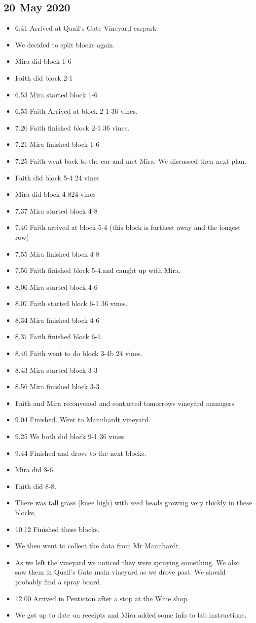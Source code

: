 \documentclass[11pt,letter]{article}
\newenvironment{smitemize}{
\begin{itemize}
  \setlength{\itemsep}{0pt}
  \setlength{\parskip}{0.8pt}
  \setlength{\parsep}{0pt}}
{\end{itemize}
}
\begin{document}
\subsection{20 May 2020}
\begin{smitemize}
\item 6.41 Arrived at Quail's Gate Vineyard carpark 
\item We decided to split blocks again. 
\item Mira did block 1-6
\item Faith did block 2-1
\item 6.53 Mira started block 1-6
\item 6.55 Faith Arrived at block 2-1 36 vines.
\item 7.20 Faith finished block 2-1 36 vines.
\item 7.21 Mira finished block 1-6
\item 7.25 Faith went back to the car and met Mira. We discussed then next plan. 
\item Faith did  block 5-4 24 vines
\item Mira did block 4-824 vines 
\item 7.37 Mira started block 4-8
\item 7.40 Faith arrived at block 5-4 (this block is furthest away and the longest row)
\item 7.55 Mira finished block 4-8
\item 7.56 Faith finished block 5-4.and caught up with Mira.
\item 8.06 Mira started block 4-6
\item 8.07 Faith started  block 6-1 36 vines.
\item 8.34 Mira finished block 4-6
\item 8.37 Faith finished block 6-1.
\item 8.40 Faith went to do block 3-4b 24 vines.
\item 8.43 Mira started block 3-3
\item 8.56 Mira finished block 3-3
\item Faith and Mira reconvened and contacted tomorrows vineyard managers
\item 9.04 Finished. Went to Mannhardt vineyard.
\item 9.25 We both did block 9-1 36 vines.
\item 9.44 Finished and drove to the next blocks.
\item Mira did 8-6.
\item Faith did 8-8.
\item There was tall grass (knee high) with seed heads growing very thickly in these blocks, 
\item 10.12 Finished these blocks.
\item We then went to collect the data from Mr Mannhardt. 
\item As we left the vineyard we noticed they were spraying something. We also saw them in Quail's Gate main vineyard as we drove past. We should probably find a spray board. 
\item 12.00 Arrived in Penticton after a stop at the Wine shop. 
\item We got up to date on receipts and Mira added some info to lab instructions.


\end{smitemize}
\end{document}
